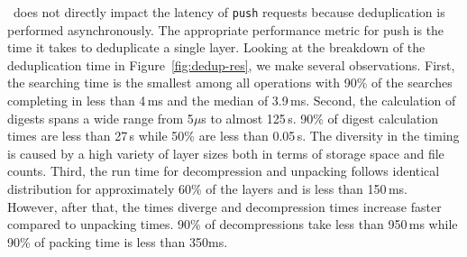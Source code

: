 \sysname\ does not directly impact the latency of \texttt{push} requests because
deduplication is performed asynchronously.
%
The appropriate performance metric for push is the time it takes to deduplicate
a single layer.
%
%
%
Looking at the breakdown of the deduplication time in
Figure~\ref{fig:dedup-res}, we make several observations.
%
First, the searching time is the smallest among all operations with 90\% of the
searches completing in less than 4\,ms and the median of 3.9\,ms.
%
%
%
Second, the calculation of digests spans a wide range from 5$\mu$s to almost
125\,s.
%
%
%
%
90\% of digest calculation times are less than 27\,s while 50\% are
less than 0.05\,s.
%
The diversity in the timing is caused by a high variety of layer sizes both in
terms of storage space and file counts.
%
%
%
Third, the run time for decompression and unpacking follows identical
distribution for approximately 60\% of the layers and is less than 150\,ms.
%
%
However, after that, the times diverge and decompression times increase faster
compared to unpacking times.
%
%
90\% of decompressions take less than 950\,ms while 90\% of packing time is less
than 350ms.

